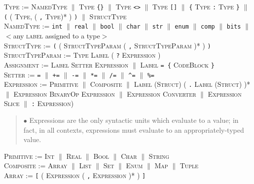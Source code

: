 \documentclass{article}
\newcommand{\code}[1]{\colorbox{light-gray}{\texttt{#1}}}
\begin{document}
\textsc{Type} := \textsc{NamedType} $\|$ \textsc{Type} \code{\{\}} $\|$ \textsc{Type} \code{<>} $\|$ \textsc{Type} \code{[]} $\|$ \code{\{} \textsc{Type} \code{:} \textsc{Type} \code{\}} $\|$ \code{(} ( \textsc{Type}, ( \code{,} \textsc{Type})* ) \code{)} $\|$ \textsc{StructType} \\

\textsc{NamedType} := \code{int} $\|$ \code{real} $\|$ \code{bool} $\|$ \code{char} $\|$ \code{str} $\|$ \code{enum} $\|$ \code{comp} $\|$ \code{bits} $\|$ $<$any \textsc{label} assigned to a type$>$ \\

\textsc{StructType} := \code{(} ( \textsc{StructTypeParam} ( \code{,} \textsc{StructTypeParam} )* ) \code{)} \\

\textsc{StructTypeParam} := \textsc{Type} \textsc{Label} ( \code{?} \textsc{Expression} ) \\

\textsc{Assignment} := \textsc{Label} \textsc{Setter} \textsc{Expression} $\|$ \textsc{Label} \code{= \{} \textsc{CodeBlock} \code{\}} \\

\textsc{Setter} := \code{=} $\|$ \code{+=} $\|$ \code{-=} $\|$ \code{*=} $\|$ \code{/=} $\|$ \code{\^{}=} $\|$ \code{\%=} \\

\textsc{Expression} := \textsc{Primitive} $\|$ \textsc{Composite} $\|$ \textsc{Label} (\textsc{Struct}) ( \code{.} \textsc{Label} (\textsc{Struct}) )* $\|$ \textsc{Expression} \textsc{BinaryOp} \textsc{Expression} $\|$ \textsc{Expression} \textsc{Converter} $\|$ \textsc{Expression} \textsc{Slice} $\|$ \code{:} \textsc{Expression})

\begin{quote} $\bullet$ Expressions are the only syntactic units which evaluate to a value; in fact, in all contexts, expressions must evaluate to an appropriately-typed value. \end{quote}

\textsc{Primitive} := \textsc{Int} $\|$ \textsc{Real} $\|$ \textsc{Bool} $\|$ \textsc{Char} $\|$ \textsc{String} \\

\textsc{Composite} := \textsc{Array} $\|$ \textsc{List} $\|$ \textsc{Set} $\|$ \textsc{Enum} $\|$ \textsc{Map} $\|$ \textsc{Tuple} \\

\textsc{Array} := \code{[} ( \textsc{Expression} ( \code{,} \textsc{Expression} )* ) \code{]} \\
\end{document}
